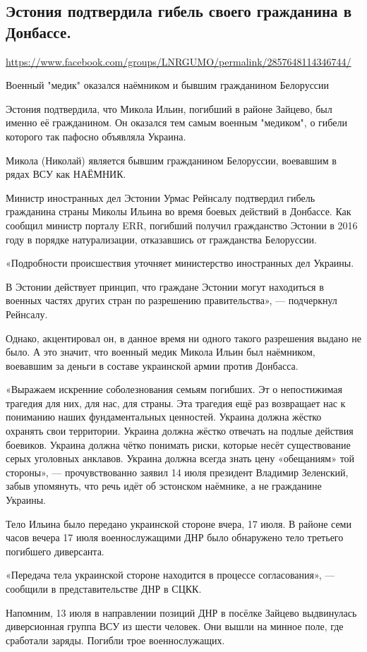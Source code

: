 
 
  
\subsection{Эстония подтвердила гибель своего гражданина в Донбассе.}
\label{sec:19_07_2020.fb.lnr.14}
\url{https://www.facebook.com/groups/LNRGUMO/permalink/2857648114346744/}

Военный "медик" оказался наёмником и бывшим гражданином Белоруссии

Эстония подтвердила, что Микола Ильин, погибший в районе Зайцево, был именно её
гражданином.  Он оказался тем самым военным "медиком", о гибели которого так
пафосно объявляла Украина.


Микола (Николай) является бывшим гражданином Белоруссии, воевавшим в рядах ВСУ
как НАЁМНИК.

Министр иностранных дел Эстонии Урмас Рейнсалу подтвердил гибель гражданина
страны Миколы Ильина во время боевых действий в Донбассе.  Как сообщил министр
порталу ERR, погибший получил гражданство Эстонии в 2016 году в порядке
натурализации, отказавшись от гражданства Белоруссии.

«Подробности происшествия уточняет министерство иностранных дел Украины.

В Эстонии действует принцип, что граждане Эстонии могут находиться в военных
частях других стран по разрешению правительства», --- подчеркнул Рейнсалу.

Однако, акцентировал он, в данное время ни одного такого разрешения выдано не
было.  А это значит, что военный медик Микола Ильин был наёмником, воевавшим
за деньги в составе украинской армии против Донбасса.

«Выражаем искренние соболезнования семьям погибших. Эт о непостижимая трагедия
для них, для нас, для страны. Эта трагедия ещё раз возвращает нас к пониманию
наших фундаментальных ценностей. Украина должна жёстко охранять свои
территории. Украина должна жёстко отвечать на подлые действия боевиков. Украина
должна чётко понимать риски, которые несёт существование серых уголовных
анклавов. Украина должна всегда знать цену «обещаниям» той стороны», —
прочувствованно заявил 14 июля президент Владимир Зеленский, забыв упомянуть,
что речь идёт об эстонском наёмнике, а не гражданине Украины.

Тело Ильина было передано украинской стороне вчера, 17 июля.  В районе семи
часов вечера 17 июля военнослужащими ДНР было обнаружено тело третьего
погибшего диверсанта.

«Передача тела украинской стороне находится в процессе согласования», —
сообщили в представительстве ДНР в СЦКК.

Напомним, 13 июля в направлении позиций ДНР в посёлке Зайцево выдвинулась
диверсионная группа ВСУ из шести человек.  Они вышли на минное поле, где
сработали заряды.  Погибли трое военнослужащих.
